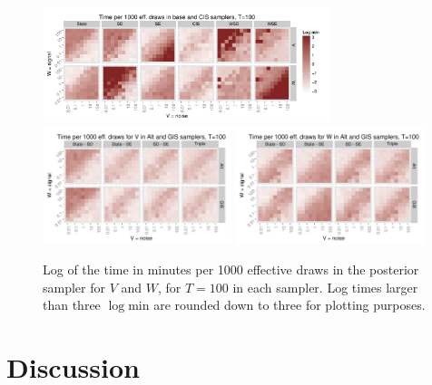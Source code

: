 \documentclass[12pt]{article}
\begin{document}
\begin{figure}[!h]
\centering
\includegraphics[width=0.75\textwidth]{basecistimeplot100}
\includegraphics[width=0.49\textwidth]{altgisVtimeplot100}
\includegraphics[width=0.49\textwidth]{altgisWtimeplot100}
\caption{Log of the time in minutes per 1000 effective draws in the posterior sampler for $V$ and $W$, for $T=100$ in each sampler. Log times larger than three $\log \mathrm{min}$ are rounded down to three for plotting purposes.}
\label{baseinttimeplot}
\end{figure}

\section{Discussion}\label{sec:Discuss}
\end{document}
